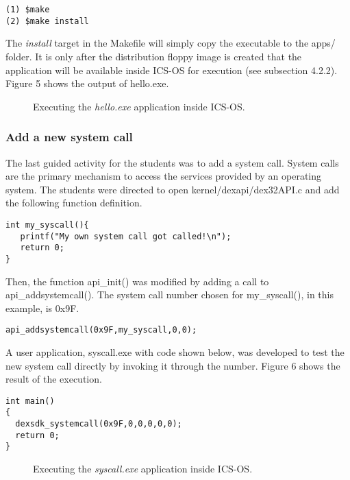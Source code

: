 \documentclass{acm_proc_article-sp}
\begin{document}
\begin{verbatim}
(1) $make
(2) $make install
\end{verbatim}

The \textit{install} target in the Makefile will simply copy the 
executable to the apps/ folder. It is only after the distribution floppy image 
is created that the application will be available inside ICS-OS for execution 
(see subsection 4.2.2). Figure 5 shows the output of hello.exe.

\begin{figure}
\centering
{}
\caption{Executing the \textit{hello.exe} application inside ICS-OS.}
\end{figure}
 

\subsubsection{Add a new system call}
The last guided activity for the students was to add a system call.
System calls are the primary mechanism to access the services provided 
by an operating system. The students were directed to open 
kernel/dexapi/dex32API.c and add the following function definition.

\begin{verbatim}
int my_syscall(){
   printf("My own system call got called!\n");
   return 0;
}
\end{verbatim}

Then, the function api\_init() was modified by adding a call to 
api\_addsystemcall(). The system call number chosen for
my\_syscall(), in this example, is 0x9F.

\begin{verbatim}
api_addsystemcall(0x9F,my_syscall,0,0);
\end{verbatim}

A user application, syscall.exe with code shown below, was developed to
test the new system call directly by invoking it through the number. Figure 6 
shows the result of the execution.

\begin{verbatim}
int main()
{
  dexsdk_systemcall(0x9F,0,0,0,0,0);
  return 0;
}
\end{verbatim}

\begin{figure}
\centering
{}
\caption{Executing the \textit{syscall.exe} application inside ICS-OS.}
\end{figure}
\end{document}
